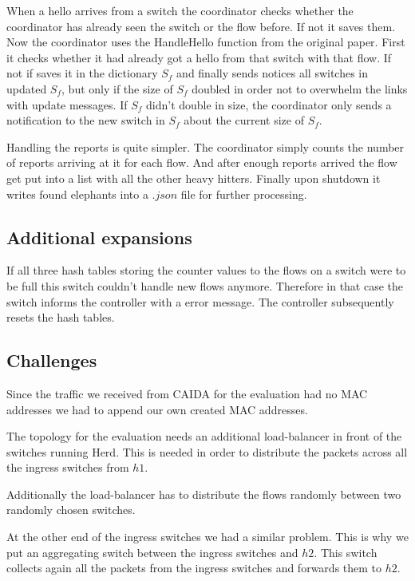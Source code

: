 \documentclass[11pt,oneside,a4paper]{article}
\begin{document}
When a hello arrives from a switch the coordinator checks whether the coordinator has already seen the switch or the flow before. If not it saves them. Now the coordinator uses the HandleHello function from the original paper. First it checks whether it had already got a hello from that switch with that flow. If not if saves it in the dictionary $S_f$ and finally sends notices all switches in updated $S_f$, but only if the size of $S_f$ doubled in order not to overwhelm the links with update messages. If $S_f$ didn't double in size, the coordinator only sends a notification to the new switch in $S_f$ about the current size of $S_f$.

Handling the reports is quite simpler. The coordinator simply counts the number of reports arriving at it for each flow. And after enough reports arrived the flow get put into a list with all the other heavy hitters. Finally upon shutdown it writes found elephants into a $.json$ file for further processing.

\subsection{Additional expansions} \label{special}%
If all three hash tables storing the counter values to the flows on a switch were to be full this switch couldn't handle new flows anymore. Therefore in that case the switch informs the controller with a error message. The controller subsequently resets the hash tables. 

\subsection{Challenges} \label{challenges}
Since the traffic we received from CAIDA for the evaluation had no MAC addresses we had to append our own created MAC addresses. 

The topology for the evaluation needs an additional load-balancer in front of the switches running Herd. This is needed in order to distribute the packets across all the ingress switches from $h1$. 

Additionally the load-balancer has to distribute the flows randomly between two randomly chosen switches. 

At the other end of the ingress switches we had a similar problem. This is why we put an aggregating switch between the ingress switches and $h2$. This switch collects again all the packets from the ingress switches and forwards them to $h2$. 
\end{document}
